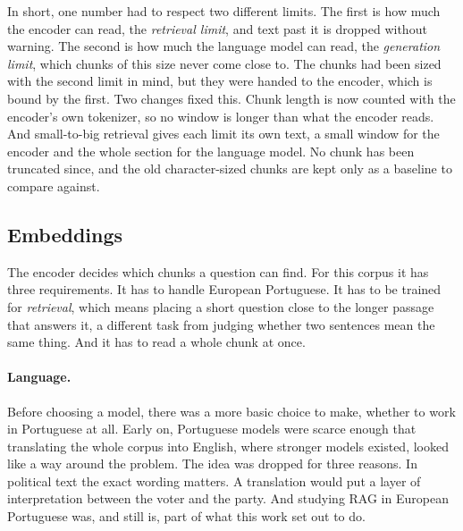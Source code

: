 In short, one number had to respect two different limits. The first is how
much the encoder can read, the \emph{retrieval limit}, and text past it is
dropped without warning. The second is how much the language model can read,
the \emph{generation limit}, which chunks of this size never come close to.
The chunks had been sized with the second limit in mind, but they were handed
to the encoder, which is bound by the first. Two changes fixed this. Chunk
length is now counted with the encoder's own tokenizer, so no window is longer
than what the encoder reads. And small-to-big retrieval gives each limit its
own text, a small window for the encoder and the whole section for the
language model. No chunk has been truncated since, and the old
character-sized chunks are kept only as a baseline to compare against.

\subsection{Embeddings} \label{subsec:embeddings}

The encoder decides which chunks a question can find. For this corpus it has
three requirements. It has to handle European Portuguese. It has to be trained
for \emph{retrieval}, which means placing a short question close to the longer
passage that answers it, a different task from judging whether two sentences
mean the same thing. And it has to read a whole chunk at once.

\paragraph{Language.} Before choosing a model, there was a more basic choice
to make, whether to work in Portuguese at all. Early on, Portuguese models were
scarce enough that translating the whole corpus into English, where stronger
models existed, looked like a way around the problem. The idea was dropped for
three reasons. In political text the exact wording matters. A translation
would put a layer of interpretation between the voter and the party. And
studying RAG in European Portuguese was, and still is, part of what this work
set out to do.

